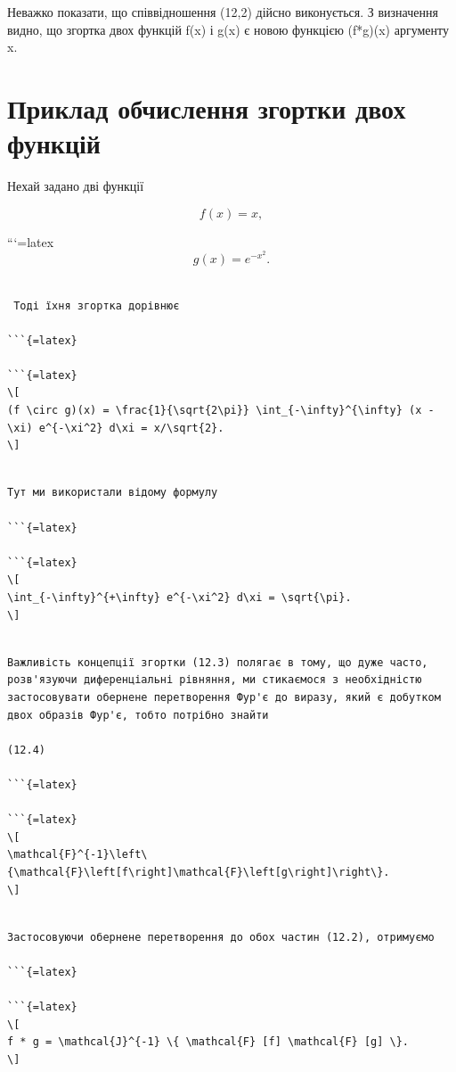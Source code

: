 \documentclass[
]{article}
\begin{document}
Неважко показати, що співвідношення (12,2) дійсно виконується. З
визначення видно, що згортка двох функцій f(x) і g(x) є новою функцією
(f*g)(x) аргументу x.

\section{Приклад обчислення згортки двох
функцій}\label{ux43fux440ux438ux43aux43bux430ux434-ux43eux431ux447ux438ux441ux43bux435ux43dux43dux44f-ux437ux433ux43eux440ux442ux43aux438-ux434ux432ux43eux445-ux444ux443ux43dux43aux446ux456ux439}

Нехай задано дві функції

\[
f(x) = x,
\]

```{=latex}
\[
g(x) = e^{-x^2}.
\]

\begin{verbatim}

 Тоді їхня згортка дорівнює

```{=latex}

```{=latex}
\[
(f \circ g)(x) = \frac{1}{\sqrt{2\pi}} \int_{-\infty}^{\infty} (x - \xi) e^{-\xi^2} d\xi = x/\sqrt{2}.
\]
\end{verbatim}

\begin{verbatim}

Тут ми використали відому формулу

```{=latex}

```{=latex}
\[
\int_{-\infty}^{+\infty} e^{-\xi^2} d\xi = \sqrt{\pi}.
\]
\end{verbatim}

\begin{verbatim}

Важливість концепції згортки (12.3) полягає в тому, що дуже часто, розв'язуючи диференціальні рівняння, ми стикаємося з необхідністю застосовувати обернене перетворення Фур'є до виразу, який є добутком двох образів Фур'є, тобто потрібно знайти

(12.4)

```{=latex}

```{=latex}
\[
\mathcal{F}^{-1}\left\{\mathcal{F}\left[f\right]\mathcal{F}\left[g\right]\right\}.
\]
\end{verbatim}

\begin{verbatim}

Застосовуючи обернене перетворення до обох частин (12.2), отримуємо

```{=latex}

```{=latex}
\[
f * g = \mathcal{J}^{-1} \{ \mathcal{F} [f] \mathcal{F} [g] \}.
\]
\end{verbatim}
\end{document}

